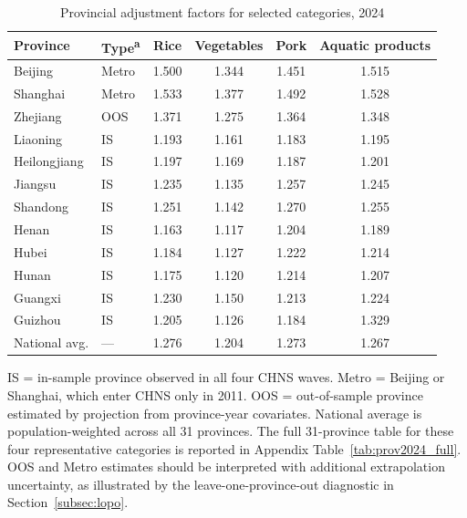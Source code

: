 \documentclass[preprint,12pt,authoryear]{elsarticle}
\begin{document}
\begin{table}[htbp]
\centering
\begin{threeparttable}
\caption{Provincial adjustment factors for selected categories, 2024}
\label{tab:provincial}
\small
\setlength{\tabcolsep}{6pt}
\renewcommand{\arraystretch}{1.1}
\begin{tabular*}{\textwidth}{@{\extracolsep{\fill}} ll cccc @{}}
\toprule
Province & Type\textsuperscript{a} & Rice & Vegetables & Pork & Aquatic products \\
\midrule
Beijing       & Metro & 1.500 & 1.344 & 1.451 & 1.515 \\
Shanghai      & Metro & 1.533 & 1.377 & 1.492 & 1.528 \\
Zhejiang      & OOS   & 1.371 & 1.275 & 1.364 & 1.348 \\
Liaoning      & IS    & 1.193 & 1.161 & 1.183 & 1.195 \\
Heilongjiang  & IS    & 1.197 & 1.169 & 1.187 & 1.201 \\
Jiangsu       & IS    & 1.235 & 1.135 & 1.257 & 1.245 \\
Shandong      & IS    & 1.251 & 1.142 & 1.270 & 1.255 \\
Henan         & IS    & 1.163 & 1.117 & 1.204 & 1.189 \\
Hubei         & IS    & 1.184 & 1.127 & 1.222 & 1.214 \\
Hunan         & IS    & 1.175 & 1.120 & 1.214 & 1.207 \\
Guangxi       & IS    & 1.230 & 1.150 & 1.213 & 1.224 \\
Guizhou       & IS    & 1.205 & 1.126 & 1.184 & 1.329 \\
\midrule
National avg. & ---   & 1.276 & 1.204 & 1.273 & 1.267 \\
\bottomrule
\end{tabular*}
\begin{tablenotes}[flushleft]
\scriptsize
\item[a] IS = in-sample province observed in all four CHNS waves. Metro = Beijing or Shanghai, which enter CHNS only in 2011. OOS = out-of-sample province estimated by projection from province-year covariates. National average is population-weighted across all 31 provinces. The full 31-province table for these four representative categories is reported in Appendix Table~\ref{tab:prov2024_full}. OOS and Metro estimates should be interpreted with additional extrapolation uncertainty, as illustrated by the leave-one-province-out diagnostic in Section~\ref{subsec:lopo}.
\end{tablenotes}
\end{threeparttable}
\end{table}
\end{document}
